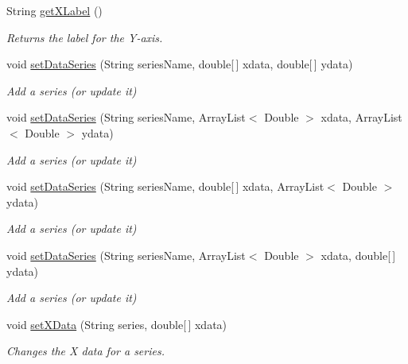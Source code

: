 \begin{DoxyCompactItemize}
String \mbox{\hyperlink{classbridges_1_1base_1_1_line_chart_a0885f5c62f950d96397b1704da6e2798}{get\+X\+Label}} ()
\begin{DoxyCompactList}\small\item\em Returns the label for the Y-\/axis. \end{DoxyCompactList}\item 
void \mbox{\hyperlink{classbridges_1_1base_1_1_line_chart_a586e9953b13e51ab9e592acfb034887b}{set\+Data\+Series}} (String series\+Name, double\mbox{[}$\,$\mbox{]} xdata, double\mbox{[}$\,$\mbox{]} ydata)
\begin{DoxyCompactList}\small\item\em Add a series (or update it) \end{DoxyCompactList}\item 
void \mbox{\hyperlink{classbridges_1_1base_1_1_line_chart_ab3b577798d421da8d8519d73dcf7ceaf}{set\+Data\+Series}} (String series\+Name, Array\+List$<$ Double $>$ xdata, Array\+List$<$ Double $>$ ydata)
\begin{DoxyCompactList}\small\item\em Add a series (or update it) \end{DoxyCompactList}\item 
void \mbox{\hyperlink{classbridges_1_1base_1_1_line_chart_ac650a150cfbf2e572a5ccdb5d25cb00b}{set\+Data\+Series}} (String series\+Name, double\mbox{[}$\,$\mbox{]} xdata, Array\+List$<$ Double $>$ ydata)
\begin{DoxyCompactList}\small\item\em Add a series (or update it) \end{DoxyCompactList}\item 
void \mbox{\hyperlink{classbridges_1_1base_1_1_line_chart_a38eb16930491bc047a5343dd73052219}{set\+Data\+Series}} (String series\+Name, Array\+List$<$ Double $>$ xdata, double\mbox{[}$\,$\mbox{]} ydata)
\begin{DoxyCompactList}\small\item\em Add a series (or update it) \end{DoxyCompactList}\item 
void \mbox{\hyperlink{classbridges_1_1base_1_1_line_chart_a2918179283e8280d47abb43df3c59195}{set\+X\+Data}} (String series, double\mbox{[}$\,$\mbox{]} xdata)
\begin{DoxyCompactList}\small\item\em Changes the X data for a series. \end{DoxyCompactList}\item 

\end{DoxyCompactItemize}
